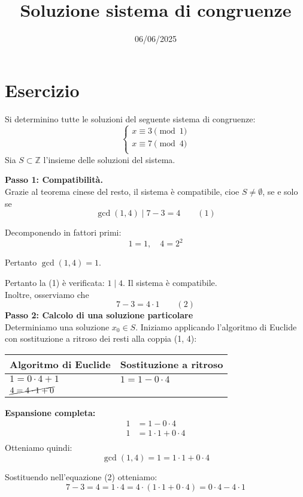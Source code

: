 \documentclass[12pt]{article}
\begin{document}
\title{Soluzione sistema di congruenze}
\date{06/06/2025}
\maketitle
\section*{Esercizio}
Si determinino tutte le soluzioni del seguente sistema di congruenze:
\[
\begin{cases}
x \equiv 3 \pmod{1} \\
x \equiv 7 \pmod{4} \\
\end{cases}
\]
Sia $S \subset \mathbb{Z}$ l'insieme delle soluzioni del sistema.

\textbf{Passo 1: Compatibilità.} \\ 
Grazie al teorema cinese del resto, il sistema è compatibile, cioe $S \neq \emptyset$, se e solo se
$$\gcd(1, 4) \mid 7 - 3 = 4 \qquad (1)$$

Decomponendo in fattori primi:
$$1 = 1, \quad 4 = 2^{2}$$

Pertanto $\gcd(1, 4) = 1$.

Pertanto la (1) è verificata: $1 \mid 4$. Il sistema è compatibile.\\
Inoltre, osserviamo che $$7 - 3 = 4 \cdot 1 \qquad (2)$$
\textbf{Passo 2: Calcolo di una soluzione particolare} \\
Determiniamo una soluzione $x_0 \in S$.
Iniziamo applicando l'algoritmo di Euclide con sostituzione a ritroso dei resti alla coppia (1, 4):
\begin{center}
\setlength{\arrayrulewidth}{0.5pt}
\begin{tabular}{|p{5cm}|p{9cm}|}
\hline
\textbf{Algoritmo di Euclide} & \textbf{Sostituzione a ritroso} \\
\hline
$1 = 0 \cdot  4 + 1$ & $1 = 1 - 0 \cdot  4$ \\
\hline
$\cancel{4 = 4 \cdot  1 + 0}$ & \\
\hline
\end{tabular}
\end{center}
\textbf{Espansione completa:}
\begin{align*}
1 &= 1 - 0\cdot4\\
1 &= 1\cdot1 + 0\cdot4\\
\end{align*}
Otteniamo quindi: $$\gcd(1, 4) = 1 = 1 \cdot 1 + 0 \cdot 4$$

Sostituendo nell'equazione (2) otteniamo:
$$7 - 3 = 4 = 1 \cdot 4 = 4 \cdot (1 \cdot 1 + 0 \cdot 4) = 0 \cdot 4 - 4 \cdot 1$$
\end{document}
